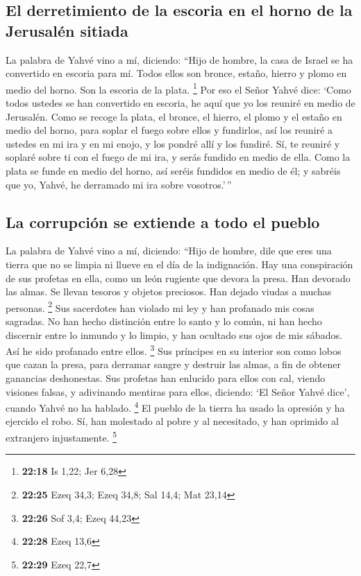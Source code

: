 \begin{paracol}{2}
\hypertarget{el-derretimiento-de-la-escoria-en-el-horno-de-la-jerusaluxe9n-sitiada}{%
\subsection{El derretimiento de la escoria en el horno de la Jerusalén
sitiada}\label{el-derretimiento-de-la-escoria-en-el-horno-de-la-jerusaluxe9n-sitiada}}

 La palabra de Yahvé vino a mí, diciendo: 
``Hijo de hombre, la casa de Israel se ha convertido en escoria para mí.
Todos ellos son bronce, estaño, hierro y plomo en medio del horno. Son
la escoria de la plata. \footnote{\textbf{22:18} Is 1,22; Jer 6,28}
 Por eso el Señor Yahvé dice: `Como todos ustedes se han
convertido en escoria, he aquí que yo los reuniré en medio de Jerusalén.
 Como se recoge la plata, el bronce, el hierro, el plomo
y el estaño en medio del horno, para soplar el fuego sobre ellos y
fundirlos, así los reuniré a ustedes en mi ira y en mi enojo, y los
pondré allí y los fundiré.  Sí, te reuniré y soplaré
sobre ti con el fuego de mi ira, y serás fundido en medio de ella.
 Como la plata se funde en medio del horno, así seréis
fundidos en medio de él; y sabréis que yo, Yahvé, he derramado mi ira
sobre vosotros.'\,''

\hypertarget{la-corrupciuxf3n-se-extiende-a-todo-el-pueblo}{%
\subsection{La corrupción se extiende a todo el
pueblo}\label{la-corrupciuxf3n-se-extiende-a-todo-el-pueblo}}

 La palabra de Yahvé vino a mí, diciendo: 
``Hijo de hombre, dile que eres una tierra que no se limpia ni llueve en
el día de la indignación.  Hay una conspiración de sus
profetas en ella, como un león rugiente que devora la presa. Han
devorado las almas. Se llevan tesoros y objetos preciosos. Han dejado
viudas a muchas personas. \footnote{\textbf{22:25} Ezeq 34,3; Ezeq 34,8;
  Sal 14,4; Mat 23,14}  Sus sacerdotes han violado mi ley
y han profanado mis cosas sagradas. No han hecho distinción entre lo
santo y lo común, ni han hecho discernir entre lo inmundo y lo limpio, y
han ocultado sus ojos de mis sábados. Así he sido profanado entre ellos.
\footnote{\textbf{22:26} Sof 3,4; Ezeq 44,23}  Sus
príncipes en su interior son como lobos que cazan la presa, para
derramar sangre y destruir las almas, a fin de obtener ganancias
deshonestas.  Sus profetas han enlucido para ellos con
cal, viendo visiones falsas, y adivinando mentiras para ellos, diciendo:
`El Señor Yahvé dice', cuando Yahvé no ha hablado. \footnote{\textbf{22:28}
  Ezeq 13,6}  El pueblo de la tierra ha usado la opresión
y ha ejercido el robo. Sí, han molestado al pobre y al necesitado, y han
oprimido al extranjero injustamente. \footnote{\textbf{22:29} Ezeq 22,7}


\end{paracol}
